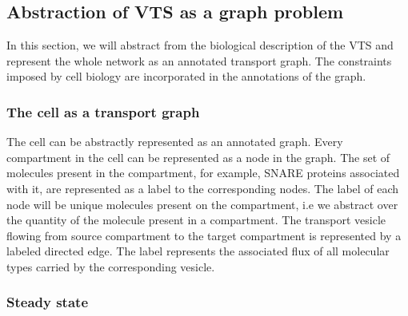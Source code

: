 \subsection{Abstraction of VTS as a graph problem}


\noindent In this section, we will abstract from the biological description of the VTS and represent the whole network as an annotated transport graph. 
%
The constraints imposed by cell biology are incorporated in the annotations of the graph. 

\subsubsection{The cell as a transport graph} 
The cell can be abstractly represented as an annotated graph. 
Every compartment in the cell can be represented as a node in the graph. 
%
The set of molecules present in the compartment, for example, SNARE proteins associated with it, are represented as a label to the corresponding nodes.
%
The label of each node will be unique molecules present on the compartment, i.e we abstract over the quantity of the molecule present in a compartment.
%
The transport vesicle flowing from source compartment to the target compartment is represented by a labeled directed edge. 
% 
The label represents the associated flux of all molecular types carried by the corresponding vesicle.
%
%

\subsubsection{Steady state} 
%
%


